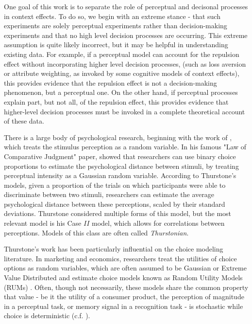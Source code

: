 One goal of this work is to separate the role of perceptual and decisonal processes in context effects. To do so, we begin with an extreme stance - that such experiments are solely perceptual experiments rather than decision-making experiments and that no high level decision processes are occurring. This extreme assumption is quite likely incorrect, but it may be helpful in understanding existing data. For example, if a perceptual model can account for the repulsion effect without incorporating higher level decision processes, (such as loss aversion or attribute weighting, as invoked by some cognitive models of context effects), this provides evidence that the repulsion effect is not a decision-making phenomenon, but a perceptual one. On the other hand, if perceptual processes explain part, but not all, of the repulsion effect, this provides evidence that higher-level decision processes must be invoked in a complete theoretical account of these data.

There is a large body of psychological research, beginning with the work of \textcite{thurstone1927law}, which treats the stimulus perception as a random variable. In his famous "Law of Comparative Judgment" paper, \textcite{thurstone1927law} showed that researchers can use binary choice proportions to estimate the psychological distance between stimuli, by treating perceptual intensity as a Gaussian random variable. According to Thurstone's models, given a proportion of the trials on which participants were able to discriminate between two stimuli, researchers can estimate the average psychological distance between these perceptions, scaled by their standard deviations. Thurstone considered multiple forms of this model, but the most relevant model is his Case $II$ model, which allows for correlations between perceptions. Models of this class are often called \textit{Thurstonian}.

Thurstone's work has been particularly influential on the choice modeling literature. In marketing and economics, researchers treat the utilities of choice options as random variables, which are often assumed to be Gaussian or Extreme Value Distributed and estimate choice models known as Random Utility Models (RUMs) \parencite{mcfadden2001economic,hausman1978conditional,train2009discrete}. Often, though not necessarily, these models share the common property that value - be it the utility of a consumer product, the perception of magnitude in a perceptual task, or memory signal in a recognition task - is stochastic while choice is deterministic  (c.f. \textcite{benjamin2009signal}).

